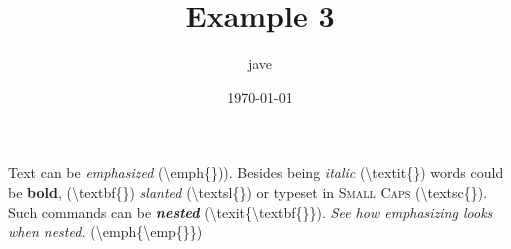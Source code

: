 \documentclass[letterpaper, 12pt]{article}
\begin{document}
\title{Example 3}
\author{jave}
\date{\today}
\maketitle


\newcommand{\emphEx}{\textbackslash{}emph\{\})}
\newcommand{\textitEx}{\textbackslash{}textit\{\}}
\newcommand{\textbfEx}{\textbackslash{}textbf\{\}}
\newcommand{\textslEx}{\textbackslash{}textsl\{\}}
\newcommand{\textscEx}{\textbackslash{}textsc\{\}}

Text can be \emph{emphasized} (\emphEx).
Besides being \textit{italic} (\textitEx) words could be \textbf{bold}, (\textbfEx)
\textsl{slanted} (\textslEx) or typeset in \textsc{Small Caps} (\textscEx).
Such commands can be \textit{\textbf{nested}} (\textbackslash{}texit\{\textbackslash{}textbf\{\}\}).
\emph{See how \emph{emphasizing} looks when nested.} (\textbackslash{}emph\{\textbackslash{}emp\{\}\})
\end{document}
